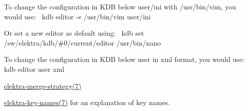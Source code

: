 To change the configuration in K\+DB below {\ttfamily user/ini} with {\ttfamily /usr/bin/vim}, you would use\+:~\newline
 {\ttfamily kdb editor -\/e /usr/bin/vim user/ini}

Or set a new editor as default using\+:~\newline
 {\ttfamily kdb set /sw/elektra/kdb/\#0/current/editor /usr/bin/nano}

To change the configuration in K\+DB below {\ttfamily user} in xml format, you would use\+:~\newline
 {\ttfamily kdb editor user xml}


\begin{DoxyItemize}
\item \hyperlink{doc_help_elektra-merge-strategy_md}{elektra-\/merge-\/strategy(7)}
\item \hyperlink{doc_help_elektra-key-names_md}{elektra-\/key-\/names(7)} for an explanation of key names. 
\end{DoxyItemize}